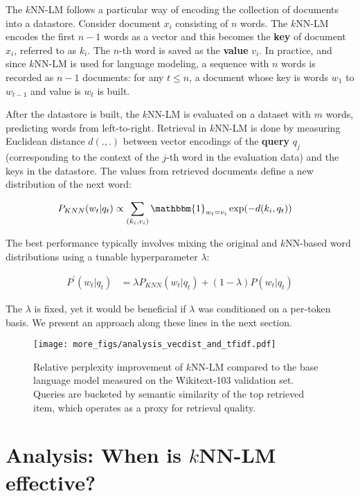 \documentclass[11pt]{article}
\begin{document}
The $k$NN-LM follows a particular way of encoding the collection of documents into a datastore. Consider document $x_i$ consisting of $n$ words. The $k$NN-LM encodes the first $n-1$ words as a vector and this becomes the \textbf{key} of document $x_i$, referred to as $k_i$. The $n$-th word is saved as the \textbf{value} $v_i$. In practice, and since $k$NN-LM is used for language modeling, a sequence with $n$ words is recorded as $n-1$ documents: for any $t \leq n$, a document whose key is words $w_1$ to $w_{t-1}$ and value is $w_t$ is built.

After the datastore is built, the $k$NN-LM is evaluated on a dataset with $m$ words, predicting words from left-to-right. Retrieval in $k$NN-LM is done by measuring Euclidean distance $d(., .)$ between vector encodings of the \textbf{query} $q_j$ (corresponding to the context of the $j$-th word in the evaluation data) and the keys in the datastore. The values from retrieved documents define a new distribution of the next word:

\begin{align} \label{eq:knn_prob}
    P_{KNN}(w_t | q_t) &\propto \sum_{(k_i, v_i)} \mathbbm{1}_{w_t = v_i} \exp(-d(k_i, q_t))
\end{align}

The best performance typically involves mixing the original and $k$NN-based word distributions using a tunable hyperparameter $\lambda$:

\begin{align*} P^{'}(w_t | q_t) &= \lambda P_{KNN}(w_t | q_t) + (1-\lambda) P(w_t | q_t)
\end{align*}

The $\lambda$ is fixed, yet it would be beneficial if $\lambda$ was conditioned on a per-token basis. We present an approach along these lines in the next section.

\begin{figure}[!t]
\centering
\texttt{[image: more\_figs/analysis\_vecdist\_and\_tfidf.pdf]}
\caption{Relative perplexity improvement of $k$NN-LM compared to the base language model measured on the Wikitext-103 validation set. Queries are bucketed by semantic similarity of the top retrieved item, which operates as a proxy for retrieval quality.}
\label{fig:analysis_vecdist}
\end{figure}

\section{Analysis: When is $k$NN-LM effective?}
\end{document}
